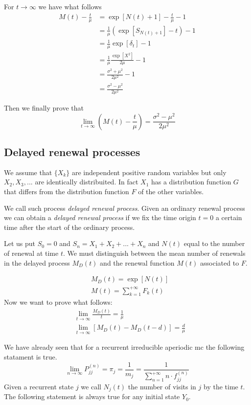 For $t \rightarrow \infty$ we have what follows
\begin{align*}
	M(t)-\frac{t}{\mu} & =\exp[N(t)+1]-\frac{t}{\mu}-1 \\
	& = \frac{1}{\mu} (\exp[S_{N(t)+1}]-t)-1 \\
	& = \frac{1}{\mu} \exp[\delta_t]-1 \\
	& = \frac{1}{\mu}\frac{\exp[X^2]}{2\mu}-1 \\
	& = \frac{\sigma^2+\mu^2}{2\mu^2}-1 \\
	& = \frac{\sigma^2-\mu^2}{2\mu^2}
\end{align*}

Then we finally prove that
\begin{equation}
	\lim_{t \rightarrow \infty} \left( M(t) - \frac{t}{\mu} \right) = \frac{\sigma^2-\mu^2}{2\mu^2}
\end{equation}

\subsection{Delayed renewal processes}
	We assume that $\{X_k\}$ are independent positive random variables but only $X_2,X_3,...$ are identically distribuited.
	In fact $X_1$ has a distribution function $G$ that differs from the distribution function $F$ of the other variables.

	We call such process \textit{delayed renewal process}. Given an ordinary renewal process we can obtain a \textit{delayed renewal process} if we fix the time origin $t=0$ a certain time after the start of the ordinary process.

	Let us put $S_0=0$ and $S_n=X_1+X_2+...+X_n$ and $N(t)$ equal to the number of renewal at time $t$. We must distinguish between the mean number of renewals in the delayed process $M_D(t)$ and the renewal function  $M(t)$ associated to $F$.

	\begin{align}
		& M_D(t) = \exp[N(t)]
		\\ & M(t) = \sum_{k=1}^{+\infty}F_k(t)
	\end{align}
	Now we want to prove what follows:
	\begin{align*}
		& \lim_{t \to \infty }\frac{M_D(t)}{t}=\frac{1}{\mu}
		\\ & \lim_{t \to \infty }[M_D(t)-M_D(t-d)]=\frac{d}{\mu}
	\end{align*}

	We have already seen that for a recurrent irreducible aperiodic \gls{mc} the following statament is true.
	\begin{equation}
		\lim_{n \to \infty} P_{jj}^{(n)}=\pi_j=\frac{1}{m_j}=\frac{1}{\sum\limits_{n=1}^{+\infty}n \cdot f_{jj}^{(n)}}
	\end{equation}
	Given a recurrent state $j$ we call $N_j(t)$ the number of visits in $j$ by the time $t$. The following statement is always true for any initial state $Y_0$.

